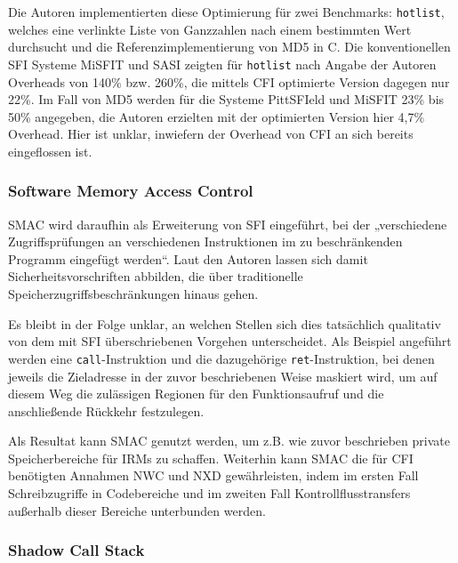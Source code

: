 \documentclass[11pt]{article}
\begin{document}
Die Autoren implementierten diese Optimierung für zwei Benchmarks:
\texttt{hotlist}, welches eine verlinkte Liste von Ganzzahlen nach einem
bestimmten Wert durchsucht und die Referenzimplementierung von MD5 in C. Die
konventionellen SFI Systeme MiSFIT und SASI zeigten für \texttt{hotlist} nach
Angabe der Autoren Overheads von 140\% bzw. 260\%, die mittels CFI optimierte
Version dagegen nur 22\%. Im Fall von MD5 werden für die Systeme PittSFIeld und
MiSFIT 23\% bis 50\% angegeben, die Autoren erzielten mit der optimierten
Version hier 4,7\% Overhead. Hier ist unklar, inwiefern der Overhead von CFI an
sich bereits eingeflossen ist.

\subsubsection{Software Memory Access Control}
\label{smac}

SMAC wird daraufhin als Erweiterung von SFI eingeführt, bei der „verschiedene
Zugriffsprüfungen an verschiedenen Instruktionen im zu beschränkenden Programm
eingefügt werden“. Laut den Autoren lassen sich damit Sicherheitsvorschriften
abbilden, die über traditionelle Speicherzugriffsbeschränkungen hinaus gehen.

Es bleibt in der Folge unklar, an welchen Stellen sich dies tatsächlich
qualitativ von dem mit SFI überschriebenen Vorgehen unterscheidet. Als Beispiel
angeführt werden eine \texttt{call}-Instruktion und die dazugehörige
\texttt{ret}-Instruktion, bei denen jeweils die Zieladresse in der zuvor
beschriebenen Weise maskiert wird, um auf diesem Weg die zulässigen Regionen
für den Funktionsaufruf und die anschließende Rückkehr festzulegen.


Als Resultat kann SMAC genutzt werden, um z.B. wie zuvor beschrieben private
Speicherbereiche für IRMs zu schaffen. Weiterhin kann SMAC die für CFI
benötigten Annahmen NWC und NXD gewährleisten, indem im ersten Fall
Schreibzugriffe in Codebereiche und im zweiten Fall Kontrollflusstransfers
außerhalb dieser Bereiche unterbunden werden.

\cite{abadi-2005-theory-fmse}

\subsubsection{Shadow Call Stack}
\label{return-solution}
\end{document}
